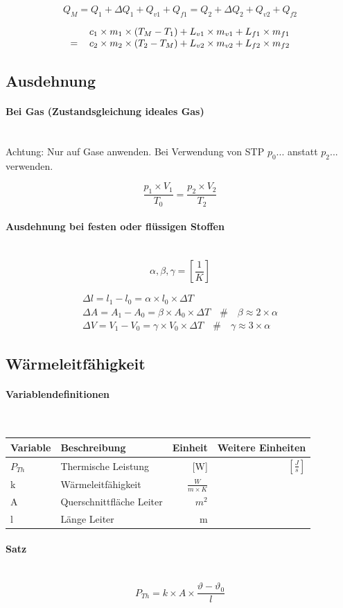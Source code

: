 \documentclass[a4paper,twoside,10pt]{article}
\newcommand{\lbparagraph}[1]{\paragraph{#1}\mbox{}\\}
\newcommand{\eqsp}[1]{\quad\#\quad}
\begin{document}
\begin{equation}
    Q_M = Q_1 + {\Delta}Q_1 + Q_{v1} + Q_{f1} = Q_2 + {\Delta}Q_2 + Q_{v2} + Q_{f2}    
\end{equation}

\begin{equation}
\begin{tabular}{ll}
    & $c_1 \times m_1 \times (T_M - T_1) + L_{v1} \times m_{v1} + L_{f1} \times m_{f1}$ \\
    = & $c_2 \times m_2 \times (T_2 - T_M) + L_{v2} \times m_{v2} + L_{f2} \times m_{f2}$
\end{tabular}
\end{equation}

\subsection{Ausdehnung}

\lbparagraph{Bei Gas (Zustandsgleichung ideales Gas)}

Achtung: Nur auf Gase anwenden. Bei Verwendung von STP $p_0...$ anstatt $p_2...$ verwenden.

\begin{equation}
    \frac{p_1 \times V_1}{T_0} = \frac{p_2 \times V_2}{T_2}
\end{equation}

\lbparagraph{Ausdehnung bei festen oder flüssigen Stoffen}

\begin{equation*}
    \alpha, \beta, \gamma = [\frac{1}{K}]
\end{equation*}

\begin{gather}
    {\Delta}l = l_1 - l_0 = \alpha \times l_0 \times {\Delta}T \\
    {\Delta}A = A_1 - A_0 = \beta \times A_0 \times {\Delta}T
    \eqsp{}
    \beta \approx 2 \times \alpha \\
    {\Delta}V = V_1 - V_0 = \gamma \times V_0 \times {\Delta}T
    \eqsp{}
    \gamma \approx 3 \times \alpha
\end{gather}

\subsection{Wärmeleitfähigkeit}

\lbparagraph{Variablendefinitionen}

\begin{tabular}{l|l|r|r}
    Variable & Beschreibung & Einheit & Weitere Einheiten \\
    \hline
    $P_{Th}$ & Thermische Leistung & [W] & $[\frac{J}{s}]$ \\
    k & Wärmeleitfähigkeit & $\frac{W}{m \times K}$ & \\
    A & Querschnittfläche Leiter & $m^2$ & \\
    l & Länge Leiter & m &
\end{tabular}

\lbparagraph{Satz}

\begin{equation}
    P_{Th} = k \times A \times \frac{\vartheta - {\vartheta}_0}{l}
\end{equation}
\end{document}
